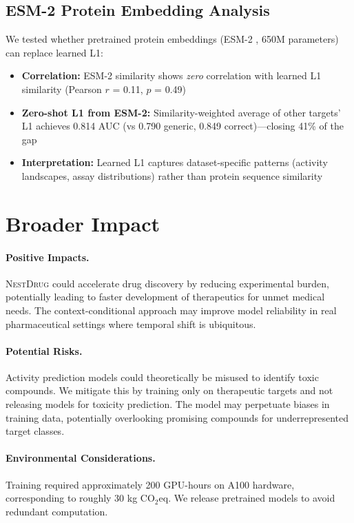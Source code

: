 \documentclass{article}
\newcommand{\methodname}{\textsc{NestDrug}}
\begin{document}
\subsection{ESM-2 Protein Embedding Analysis}

We tested whether pretrained protein embeddings (ESM-2 \citep{lin_2023_esm2}, 650M parameters) can replace learned L1:

\begin{itemize}[noitemsep,topsep=0pt]
\item \textbf{Correlation:} ESM-2 similarity shows \textit{zero} correlation with learned L1 similarity (Pearson $r$ = 0.11, $p$ = 0.49)
\item \textbf{Zero-shot L1 from ESM-2:} Similarity-weighted average of other targets' L1 achieves 0.814 AUC (vs 0.790 generic, 0.849 correct)---closing 41\% of the gap
\item \textbf{Interpretation:} Learned L1 captures dataset-specific patterns (activity landscapes, assay distributions) rather than protein sequence similarity
\end{itemize}

\section{Broader Impact}
\label{app:impact}

\paragraph{Positive Impacts.} \methodname{} could accelerate drug discovery by reducing experimental burden, potentially leading to faster development of therapeutics for unmet medical needs. The context-conditional approach may improve model reliability in real pharmaceutical settings where temporal shift is ubiquitous.

\paragraph{Potential Risks.} Activity prediction models could theoretically be misused to identify toxic compounds. We mitigate this by training only on therapeutic targets and not releasing models for toxicity prediction. The model may perpetuate biases in training data, potentially overlooking promising compounds for underrepresented target classes.

\paragraph{Environmental Considerations.} Training required approximately 200 GPU-hours on A100 hardware, corresponding to roughly 30 kg CO$_2$eq. We release pretrained models to avoid redundant computation.
\end{document}
